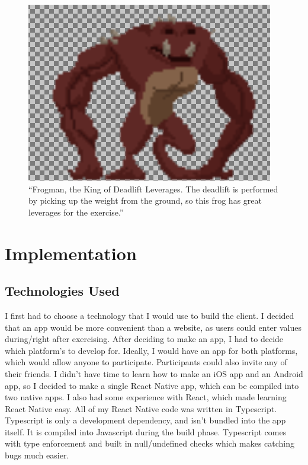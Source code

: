 \documentclass{l4proj}
\begin{document}
\begin{figure}[H]
    \centering
    \includegraphics[width=1.0\linewidth]{froggie.png}    
    \caption{
      ``Frogman, the King of Deadlift Leverages. The deadlift is performed by picking up the weight from the ground, so this frog has great leverages for the exercise.''
    }
    \label{fig:frogman} 
\end{figure}

\chapter{Implementation}

\section{Technologies Used}
I first had to choose a technology that I would use to build the client. I decided that an app would be more convenient than a website, as users could enter values during/right after exercising. After deciding to make an app, I had to decide which platform's to develop for. Ideally, I would have an app for both platforms, which would allow anyone to participate. Participants could also invite any of their friends. I didn't have time to learn how to make an iOS app and an Android app, so I decided to make a single React Native app, which can be compiled into two native apps. I also had some experience with React, which made learning React Native easy. All of my React Native code was written in Typescript. Typescript is only a development dependency, and isn't bundled into the app itself. It is compiled into Javascript during the build phase. Typescript comes with type enforcement and built in null/undefined checks which makes catching bugs much easier. 
\end{document}
